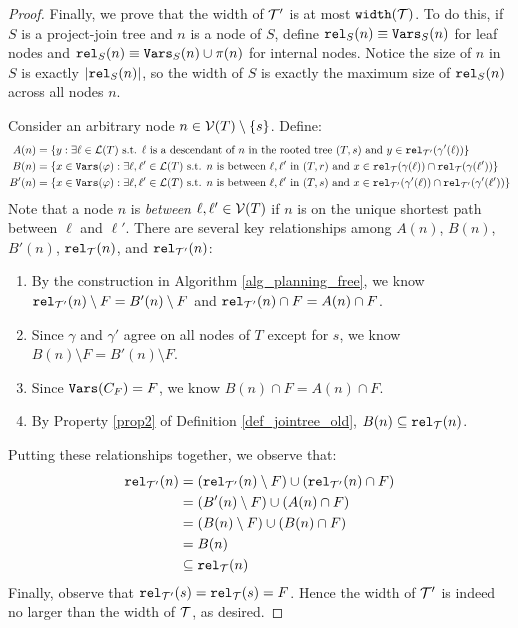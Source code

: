 \begin{proof}
Finally, we prove that the width of $\mathcal{T}'$ is at most $\texttt{\upshape width}(\mathcal{T})$. 
To do this, if $S$ is a project-join tree and $n$ is a node of $S$, define $\texttt{\upshape rel}_S(n) \equiv \texttt{\upshape Vars}_S(n)$ for leaf nodes and $\texttt{\upshape rel}_S(n) \equiv \texttt{\upshape Vars}_S(n) \cup \pi(n)$ for internal nodes. Notice the size of $n$ in $S$ is exactly $|\texttt{\upshape rel}_S(n)|$, so the width of $S$ is exactly the maximum size of $\texttt{\upshape rel}_S(n)$ across all nodes $n$. 

Consider an arbitrary node $n \in \mathcal{V}(T) \setminus \{s\}$. Define:
\begin{align*}
    A(n) &= \left\{  y : \exists \ell \in \mathcal{L}(T) \text{ s.t. $\ell$ is a descendant of $n$ in the rooted tree $(T, s)$ and } y \in \texttt{\upshape rel}_{\mathcal{T}'}(\gamma'(\ell))  \right\} \\
    B(n) &= \left\{  x \in \texttt{\upshape Vars}(\varphi) : \exists \ell, \ell' \in \mathcal{L}(T) \text{ s.t. $n$ is between $\ell, \ell'$ in $(T, r)$ and } x \in \texttt{\upshape rel}_{\mathcal{T}}(\gamma(\ell)) \cap \texttt{\upshape rel}_{\mathcal{T}}(\gamma(\ell'))  \right\} \\
    B'(n) &= \left\{  x \in \texttt{\upshape Vars}(\varphi) : \exists \ell, \ell' \in \mathcal{L}(T) \text{ s.t. $n$ is between $\ell, \ell'$ in $(T, s)$ and } x \in \texttt{\upshape rel}_{\mathcal{T}'}(\gamma'(\ell)) \cap \texttt{\upshape rel}_{\mathcal{T}'}(\gamma'(\ell'))  \right\}
\end{align*}
Note that a node $n$ is \emph{between} $\ell, \ell' \in \mathcal{V}(T)$ if $n$ is on the unique shortest path between $\ell$ and $\ell'$. There are several key relationships among $A(n)$, $B(n)$, $B'(n)$, $\texttt{\upshape rel}_{\mathcal{T}}(n)$, and $\texttt{\upshape rel}_{\mathcal{T}'}(n)$: 
\begin{enumerate}
    \item By the construction in Algorithm \ref{alg_planning_free}, we know $\texttt{\upshape rel}_{\mathcal{T}'}(n) \setminus F = B'(n) \setminus F$ and $\texttt{\upshape rel}_{\mathcal{T}'}(n) \cap F = A(n) \cap F$.
    \item Since $\gamma$ and $\gamma'$ agree on all nodes of $T$ except for $s$, we know $B(n) \setminus F = B'(n) \setminus F$.
    \item Since $\texttt{\upshape Vars}(C_F) = F$, we know $B(n) \cap F = A(n) \cap F$.
    \item By Property \ref{prop2} of Definition \ref{def_jointree_old}, $B(n) \subseteq \texttt{\upshape rel}_{\mathcal{T}}(n)$. 
\end{enumerate}
Putting these relationships together, we observe that:
\begin{align*}
    \texttt{\upshape rel}_{\mathcal{T}'}(n) &= (\texttt{\upshape rel}_{\mathcal{T}'}(n) \setminus F) \cup (\texttt{\upshape rel}_{\mathcal{T}'}(n) \cap F) \\
    &= (B'(n) \setminus F) \cup (A(n) \cap F) \\
    &= (B(n) \setminus F) \cup (B(n) \cap F) \\
    &= B(n) \\
    &\subseteq \texttt{\upshape rel}_{\mathcal{T}}(n)
\end{align*}
Finally, observe that $\texttt{\upshape rel}_{\mathcal{T}'}(s) = \texttt{\upshape rel}_{\mathcal{T}}(s) = F$.
Hence the width of $\mathcal{T}'$ is indeed no larger than the width of $\mathcal{T}$, as desired.
\end{proof}
 

